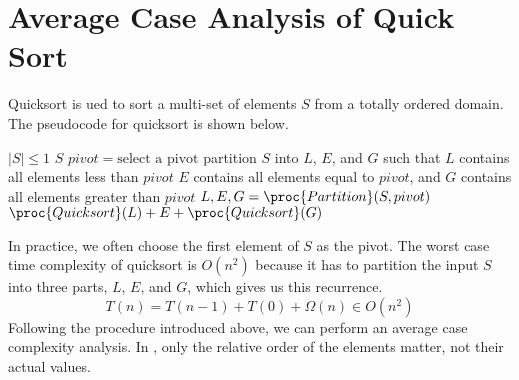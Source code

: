 \section{Average Case Analysis of Quick Sort}

Quicksort is ued to sort a multi-set of elements $S$ from a totally ordered domain. The pseudocode for quicksort is shown below.

\begin{codebox}
    \li \If $|S| \leq 1$
    \li \Then \Return $S$ \End
    \li $pivot = \text{select a pivot}$
    \zi \Comment partition $S$ into $L$, $E$, and $G$ such that $L$ contains all elements less than $pivot$
    \zi \Comment $E$ contains all elements equal to $pivot$, and $G$ contains all elements greater than $pivot$
    \li $L,E,G = \proc{Partition}(S,pivot)$
    \li \Return $\proc{Quicksort}(L) + E + \proc{Quicksort}(G)$
\end{codebox}

In practice, we often choose the first element of $S$ as the pivot. The worst case time complexity of quicksort is $O(n^2)$ because it has to partition the input $S$ into three parts, $L$, $E$, and $G$, which gives us this recurrence.
$$
T(n) = T(n-1) + T(0) + \Omega(n) \in O(n^2)
$$
Following the procedure introduced above, we can perform an average case complexity analysis. In , only the relative order of the elements matter, not their actual values.


